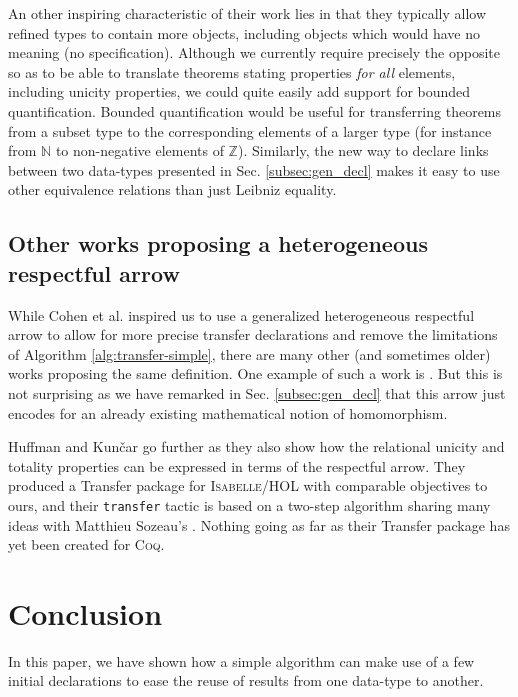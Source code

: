 \documentclass{llncs}
\begin{document}
An other inspiring characteristic of their work lies in that
they typically allow
refined types to contain more objects, including objects which would have
no meaning (no specification).
Although we currently require precisely the opposite so as to be
able to translate theorems stating properties \emph{for all} elements,
including unicity properties, we could quite easily add support for
bounded quantification. Bounded quantification would be useful for
transferring theorems from a subset type to the corresponding elements
of a larger type (for instance from $\mathbb{N}$ to non-negative elements
of $\mathbb{Z}$). Similarly, the new way to declare links between two
data-types presented in Sec. \ref{subsec:gen_decl} makes it easy to use
other equivalence relations than just Leibniz equality.

\subsection{Other works proposing a heterogeneous respectful arrow}

While Cohen et al. \cite{Cohen2013} inspired us to use a
generalized heterogeneous respectful arrow to allow for more precise
transfer declarations and remove the limitations of Algorithm
\ref{alg:transfer-simple},
there are many other (and sometimes older) works proposing
the same definition.
One example of such a work is \cite[Def. 13]{homeier2005design}.
But this is not surprising as we have remarked in Sec. \ref{subsec:gen_decl}
that this arrow just encodes for an already existing mathematical
notion of homomorphism.

Huffman and Kun\v{c}ar \cite{huffman2013lifting} go further as
they also show how the relational unicity and totality properties
can be expressed in terms of the respectful arrow.
They produced a Transfer package for \textsc{Isabelle/HOL} with
comparable objectives to ours, and their \texttt{transfer} tactic
is based on a two-step algorithm
sharing many ideas with Matthieu Sozeau's \cite{Sozeau2010}.
Nothing going as far as their Transfer package has yet been
created for \textsc{Coq}.

\section{Conclusion}

In this paper, we have shown how a simple algorithm can make use of a
few initial declarations to ease the reuse of results from one data-type
to another.
\end{document}
